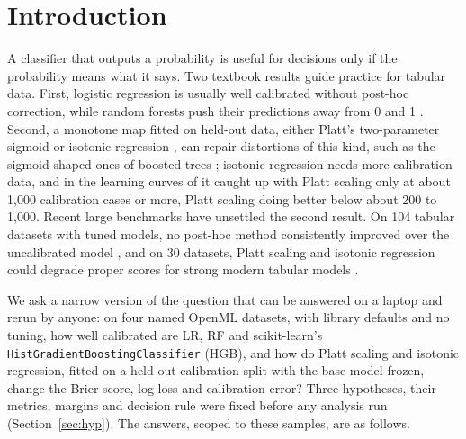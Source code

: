 \documentclass[11pt]{article}
\begin{document}
\section{Introduction}
\label{sec:intro}

A classifier that outputs a probability is useful for decisions only if the probability
means what it says. Two textbook results guide practice for tabular data. First, logistic
regression is usually well calibrated without post-hoc correction, while random forests
push their predictions away from 0 and 1 \citep{niculescumizil2005}. Second, a monotone map
fitted on held-out data, either Platt's two-parameter sigmoid \citep{platt1999} or isotonic
regression \citep{zadrozny2002}, can repair distortions of this kind, such as the
sigmoid-shaped ones of boosted trees \citep{niculescumizil2005boosting}; isotonic regression needs more calibration data, and in
the learning curves of \citet{niculescumizil2005} it caught up with Platt scaling only at about
1,000 calibration cases or more, Platt scaling doing better below about 200 to 1,000. Recent large benchmarks have unsettled the
second result. On 104 tabular datasets with tuned models, no post-hoc method consistently
improved over the uncalibrated model \citep{berta2026}, and on 30 datasets, Platt scaling and
isotonic regression could degrade proper scores for strong modern tabular models
\citep{manokhin2026}.

We ask a narrow version of the question that can be answered on a laptop and rerun by
anyone: on four named OpenML datasets, with library defaults and no tuning, how well
calibrated are LR, RF and scikit-learn's \texttt{HistGradientBoostingClassifier} (HGB), and
how do Platt scaling and isotonic regression, fitted on a held-out calibration split with the
base model frozen, change the Brier score, log-loss and calibration error? Three hypotheses,
their metrics, margins and decision rule were fixed before any analysis run
(Section~\ref{sec:hyp}). The answers, scoped to these samples, are as follows.
\end{document}
